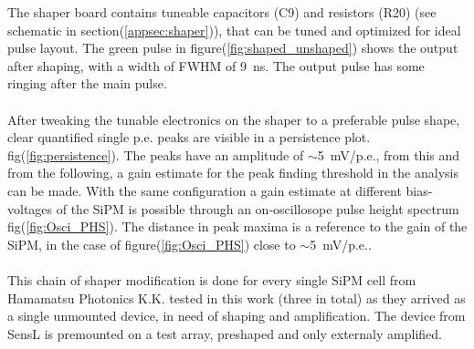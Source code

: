 \documentclass[12pt,article,type=msc,colorback,accentcolor=tud9c]{tudthesis}
\begin{document}
The shaper board contains tuneable capacitors (C9) and resistors (R20) (see schematic in section(\ref{appsec:shaper})), that can be tuned and optimized for ideal pulse layout. The green pulse in figure(\ref{fig:shaped_unshaped}) shows the output after shaping, with a width of FWHM of 9~ns. The output pulse has some ringing after the main pulse.\\\\
After tweaking the tunable electronics on the shaper to a preferable pulse shape, clear quantified single p.e. peaks are visible in a persistence plot. fig(\ref{fig:persistence}). The peaks have an amplitude of $\sim$5~mV/p.e., from this and from the following, a gain estimate for the peak finding threshold in the analysis can be made. With the same configuration a gain estimate at different bias-voltages of the SiPM is possible through an on-oscillosope pulse height spectrum fig(\ref{fig:Osci_PHS}). The distance in peak maxima is a reference to the gain of the SiPM, in the case of figure(\ref{fig:Osci_PHS}) close to $\sim$5~mV/p.e..\\\\
This chain of shaper modification is done for every single SiPM cell from Hamamatsu Photonics K.K. tested in this work (three in total) as they arrived as a single unmounted device, in need of shaping and amplification. The device from SensL is premounted on a test array, preshaped and only externaly amplified.








\clearpage
\end{document}
